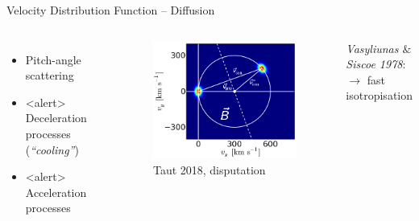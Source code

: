 \documentclass{beamer}
\begin{document}
\begin{frame}{Velocity Distribution Function -- Diffusion} %
\begin{columns}
	\column{5cm}
		\begin{itemize}
			\item Pitch-angle scattering 
			\vspace{1cm}
			\item<alert> Deceleration processes (\textit{``cooling''})
			\vspace{1cm}
			\item<alert> Acceleration processes
		\end{itemize}
	\column{7.5cm}
		\begin{figure}
			\includegraphics[scale=0.3]{pictures/2d_b_schief.png}
			\caption{\tiny{Taut 2018, disputation}}
		\end{figure}
\begin{center}
	   \textit{Vasyliunas $\&$ Siscoe 1978}: \\$\rightarrow$ fast isotropisation
\end{center}
\end{columns}
\end{frame}
\end{document}
